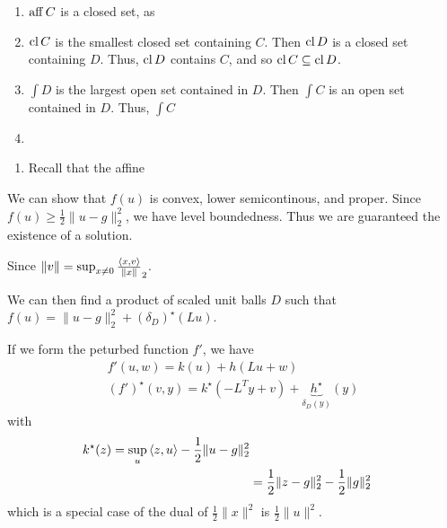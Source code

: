 \begin{exercises}
\item
  \begin{enumerate}
  \item $\operatorname*{aff} C$ is a closed set, as  
  \item $\operatorname*{cl} C$ is the smallest closed set containing $C$.  Then $\operatorname*{cl}
    D$ is a closed set containing $D$.  Thus, $\operatorname*{cl} D$ contains $C$,
    and so $\operatorname*{cl} C \subseteq \operatorname*{cl} D$.
  \item $\int D$ is the largest open set contained in $D$. Then $\int
    C$ is an open set contained in $D$.  Thus, $\int C$ 

  \item {}
  \end{enumerate}
\item
  \begin{enumerate}
  \item Recall that the affine
  \end{enumerate}
\item 
\item
\item
\item
\item
\item
\item
\item
\item We can show that $f(u)$ is convex, lower semicontinous, and
  proper. Since $f(u) \geq \frac{1}{2} \| u - g \|_{2}^{2}$, we have
  level boundedness.  Thus we are guaranteed the existence of a
  solution.

  Since $\| v \| = \sup_{x \neq 0} \frac{\IP{x, v}}{\| x \|}_{2}$.

  We can then find a product of scaled unit balls $D$ such that $f(u) = \| u
  - g \|_{2}^{2} + (\delta_{D})^{\star}(Lu)$.

  If we form the peturbed function $f'$, we have
  \begin{align}
    \label{eq:36}
    f'(u, w) = k(u) + h(Lu + w) \\
    (f')^{\star}(v, y) = k^{\star}(-L^{T}y + v) +
    \underbrace{h^{\star}}_{\delta_{D}(y)}(y) 
  \end{align} with
  \begin{align}
    \label{eq:38}
    k^{\star}(z) = \sup_{u} \IP{z, u} - \frac{1}{2}\| u - g \|_{2}^{2}
    \\
    &= \frac{1}{2} \| z - g \|_{2}^{2} - \frac{1}{2} \| g \|_{2}^{2}
  \end{align} which is a special case of the dual of $\frac{1}{2} \| x
  \|^{2}$ is $\frac{1}{2} \| u \|^{2}$.


\end{exercises}
